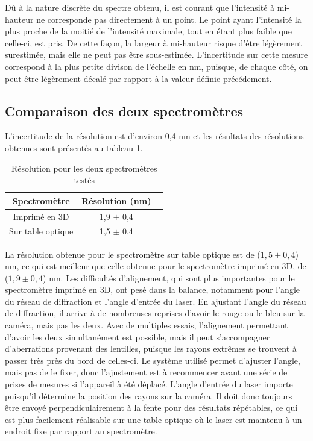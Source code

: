 \documentclass[11pt,letterpaper]{article}
\begin{document}
Dû à la nature discrète du spectre obtenu, il est courant que l'intensité à 
mi-hauteur ne corresponde pas directement à un point. Le point ayant l'intensité la plus proche
de la moitié de l'intensité maximale, tout en étant plus faible que celle-ci, est pris. De
cette façon, la largeur à mi-hauteur risque d'être légèrement surestimée, mais elle ne peut pas
être sous-estimée. L'incertitude sur cette mesure correspond à la plus petite divison de l'échelle en nm,
puisque, de chaque côté, on peut être légèrement décalé par rapport à la valeur définie précédement.

\subsection{Comparaison des deux spectromètres}

L'incertitude de la résolution est d'environ 0,4 nm et les résultats des résolutions 
obtenues sont présentés au tableau \ref{res_tab}.

\begin{table}[H]
  \centering
  \begin{tabular}{|c|c|c|}\hline
    Spectromètre & Résolution (nm) \\
    \hline
    Imprimé en 3D & 1,9 $\pm$ 0,4\\    \hline
    Sur table optique & 1,5 $\pm$ 0,4\\    \hline
  \end{tabular}
  \caption{Résolution pour les deux spectromètres testés}
  \label{res_tab}
\end{table}

La résolution obtenue pour le spectromètre sur table optique est de ($1,5 \pm 0,4$) nm, ce qui
est meilleur que celle obtenue pour le spectromètre imprimé en 3D, de ($1,9 \pm 0,4$) nm. Les difficultés d'alignement, qui sont plus importantes pour le spectromètre imprimé en 3D, ont
pesé dans la balance, notamment pour l'angle du réseau de diffraction et l'angle d'entrée du laser. 
En ajustant l'angle du réseau de diffraction, il arrive à de nombreuses reprises d'avoir 
le rouge ou le bleu sur la caméra, mais pas les deux.
Avec de multiples essais, l'alignement permettant d'avoir les deux simultanément est possible,
mais il peut s'accompagner d'aberrations provenant des lentilles, puisque les rayons extrêmes
se trouvent à passer très près du bord de celles-ci. Le système utilisé permet d'ajuster l'angle,
mais pas de le fixer, donc l'ajustement est à recommencer avant une série de prises de mesures si
l'appareil à été déplacé. 
L'angle d'entrée du laser importe puisqu'il détermine la position des rayons sur la caméra. Il doit
donc toujours être envoyé perpendiculairement à la fente pour des résultats répétables, ce qui est
plus facilement réalisable sur une table optique où le laser est maintenu à un endroit fixe par 
rapport au spectromètre.  
\end{document}
